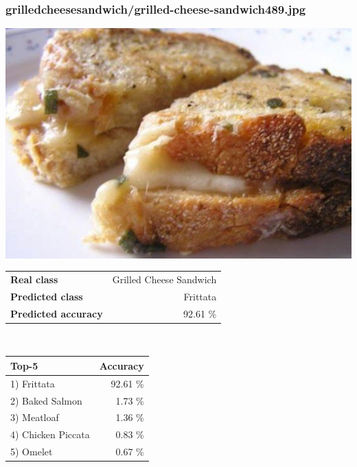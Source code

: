 \subsubsection{grilled\textunderscore cheese\textunderscore sandwich/grilled-cheese-sandwich489.jpg}

\begin{minipage}[t]{0.4\textwidth}
	\vspace{0pt}
	\includegraphics[width=\linewidth]{images/evaluation-images/grilled_cheese_sandwich/grilled-cheese-sandwich489.jpg}
\end{minipage}
\hfill
\begin{minipage}[t]{0.5\textwidth}
	\vspace{0pt}\raggedright
	\begin{tabularx}{\textwidth}{X r}
		\small \textbf{Real class} & \small Grilled Cheese Sandwich\\
		\small \textbf{Predicted class} & \small Frittata\\
		\small \textbf{Predicted accuracy} & \small 92.61 \%
    \end{tabularx}\\
    
    \vspace{6pt}
	\begin{tabularx}{\textwidth}{X r}
        \small \textbf{Top-5} & \small \textbf{Accuracy} \\
        \hline
		\small 1) Frittata & \small 92.61 \%\\\small 2) Baked Salmon & \small 1.73 \%\\\small 3) Meatloaf & \small 1.36 \%\\\small 4) Chicken Piccata & \small 0.83 \%\\\small 5) Omelet & \small 0.67 \%
    \end{tabularx}
\end{minipage}
    
